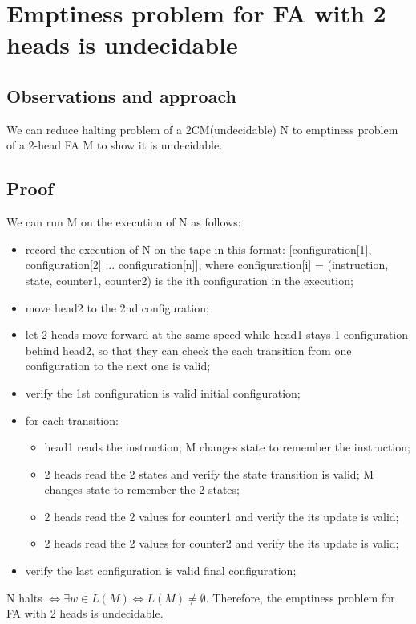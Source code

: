 \documentclass{article}
\begin{document}
\section{Emptiness problem for FA with 2 heads is undecidable}

\subsection{Observations and approach}
We can reduce halting problem of a 2CM(undecidable) N to emptiness problem of a 2-head FA M to show it is undecidable.

\subsection{Proof}
We can run M on the execution of N as follows:
\begin{itemize}
	\item record the execution of N on the tape in this format: [configuration[1], configuration[2] ... configuration[n]], where configuration[i] = (instruction, state, counter1, counter2) is the ith configuration in the execution;
	\item move head2 to the 2nd configuration;
	\item let 2 heads move forward at the same speed while head1 stays 1 configuration behind head2, so that they can check the each transition from one configuration to the next one is valid;
	\item verify the 1st configuration is valid initial configuration;
	\item for each transition:
	\begin{itemize}
		\item head1 reads the instruction; M changes state to remember the instruction;
		\item 2 heads read the 2 states and verify the state transition is valid; M changes state to remember the 2 states;
		\item 2 heads read the 2 values for counter1 and verify the its update is valid;
		\item 2 heads read the 2 values for counter2 and verify the its update is valid;
	\end{itemize}
	\item verify the last configuration is valid final configuration;
\end{itemize}
N halts $ \iff \exists w \in L(M) \iff L(M) \neq \emptyset$. Therefore, the emptiness problem for FA with 2 heads is undecidable.
\end{document}
